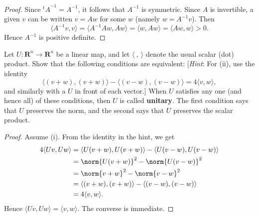 {{\begin{Solution}
\begin{proof}
            Since ${^{t\!}A}^{-1} = A^{-1}$, it follows that $A^{-1}$ is symmetric. 
            Since $A$ is invertible, a given $v$ can be written $v = Aw$ for some $w$ (namely $w = A^{-1}v$). 
            Then 
            \begin{equation*}
                \langle A^{-1}v, v \rangle = \langle A^{-1}Aw, Aw \rangle = \langle w, Aw \rangle = \langle Aw, w \rangle > 0. 
            \end{equation*}
            Hence $A^{-1}$ is positive definite. 
        \end{proof}
    \end{Solution}
    \item 
    Let $U: \mathbf{R}^n \to \mathbf{R}^n$ be a linear map, and let $\langle \ , \ \rangle$ denote the usual scalar (dot) product. 
    Show that the following conditions are equivalent: 
    [\textit{Hint}: For (ii), use the identity 
    \begin{equation*}
        \langle (v + w), (v + w) \rangle - \langle (v - w), (v - w) \rangle = 4\langle v, w \rangle, 
    \end{equation*}
    and similarly with a $U$ in front of each vector.] 
    When $U$ satisfies any one (and hence all) of these conditions, then $U$ is called \textbf{unitary}. 
    The first condition says that $U$ preserves the norm, and the second says that $U$ preserves the scalar product. 
    \begin{Solution}
        \begin{proof}
            Assume (i).             
            From the identity in the hint, we get 
            \begin{equation*}
                \begin{aligned}
                    4 \langle Uv, Uw \rangle &= \langle U(v + w), U(v + w) \rangle - \langle U(v - w), U(v - w) \rangle \\
                    &= \norm{U(v + w)}^2 - \norm{U(v - w)}^2 \\
                    &= \norm{v + w}^2 - \norm{v - w}^2 \\
                    &= \langle (v + w), (v + w) \rangle - \langle (v - w), (v - w) \rangle \\
                    &= 4\langle v, w \rangle. 
                \end{aligned}
            \end{equation*}
            Hence $\langle Uv, Uw \rangle = \langle v, w \rangle$. 
            The converse is immediate. 


\end{proof}
\end{Solution}}}
